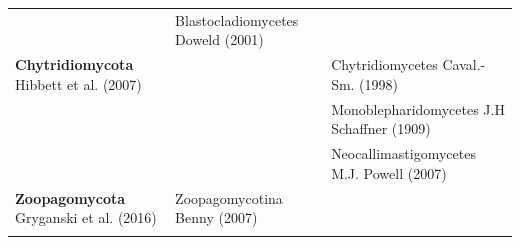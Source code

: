 \documentclass[]{book}
\begin{document}
\begin{longtable}[]{@{}lll@{}}
\begin{minipage}[t]{0.28\columnwidth}
\strut
\end{minipage} & \begin{minipage}[t]{0.31\columnwidth}\raggedright\strut
Blastocladiomycetes Doweld (2001)\strut
\end{minipage}\tabularnewline
\begin{minipage}[t]{0.32\columnwidth}\raggedright\strut
\textbf{Chytridiomycota} Hibbett et al. (2007)\strut
\end{minipage} & \begin{minipage}[t]{0.28\columnwidth}\raggedright\strut
\strut
\end{minipage} & \begin{minipage}[t]{0.31\columnwidth}\raggedright\strut
Chytridiomycetes Caval.-Sm. (1998)\strut
\end{minipage}\tabularnewline
\begin{minipage}[t]{0.32\columnwidth}\raggedright\strut
\strut
\end{minipage} & \begin{minipage}[t]{0.28\columnwidth}\raggedright\strut
\strut
\end{minipage} & \begin{minipage}[t]{0.31\columnwidth}\raggedright\strut
Monoblepharidomycetes J.H Schaffner (1909)\strut
\end{minipage}\tabularnewline
\begin{minipage}[t]{0.32\columnwidth}\raggedright\strut
\strut
\end{minipage} & \begin{minipage}[t]{0.28\columnwidth}\raggedright\strut
\strut
\end{minipage} & \begin{minipage}[t]{0.31\columnwidth}\raggedright\strut
Neocallimastigomycetes M.J. Powell (2007)\strut
\end{minipage}\tabularnewline
\begin{minipage}[t]{0.32\columnwidth}\raggedright\strut
\textbf{Zoopagomycota} Gryganski et al. (2016)\strut
\end{minipage} & \begin{minipage}[t]{0.28\columnwidth}\raggedright\strut
Zoopagomycotina Benny (2007)\strut
\end{minipage} & \begin{minipage}[t]{0.31\columnwidth}\raggedright\strut
\strut
\end{minipage}\tabularnewline
\begin{minipage}[t]{0.32\columnwidth}\raggedright\strut
\strut
\end{minipage} & \begin{minipage}[t]{0.28\columnwidth}\raggedright\strut

\end{minipage}
\end{longtable}
\end{document}
